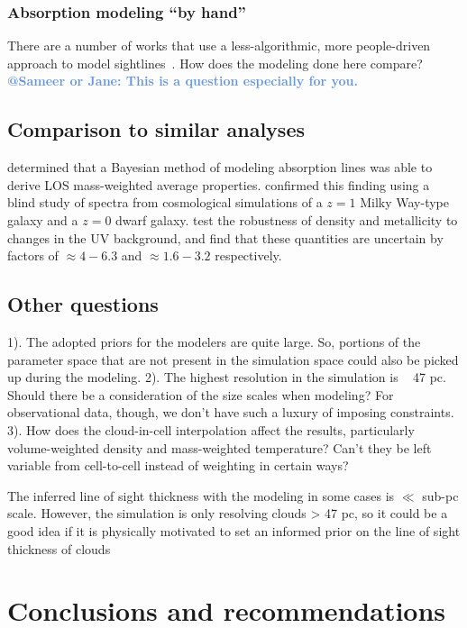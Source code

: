 \documentclass[fleqn,usenatbib]{mnras}
\makeatletter
\newcommand{\atsameer}[1]{\textcolor{CornflowerBlue}{\textbf{@Sameer or Jane: #1}}}
\makeatother
\begin{document}
\subsubsection{Absorption modeling ``by hand''}

There are a number of works that use a less-algorithmic, more people-driven approach to model sightlines~\citep[e.g.][]{Lacki2010}.
How does the modeling done here compare?
\atsameer{This is a question especially for you.}

\subsection{Comparison to similar analyses}

\cite{Liang2018} determined that a Bayesian method of modeling absorption lines was able to derive LOS mass-weighted average properties.
\cite{Marra2021} confirmed this finding using a blind study of spectra from cosmological simulations of a $z=1$ Milky Way-type galaxy and a $z=0$ dwarf galaxy.
\cite{Acharya2021} test the robustness of density and metallicity to changes in the UV background, and find that these quantities are uncertain by factors of $\approx 4-6.3$ and $\approx 1.6-3.2$ respectively.
\cite{Sameer2021} 

\subsection{Other questions}

1). The adopted priors for the modelers are quite large. So, portions of the parameter space that are not present in the simulation space could also be picked up during the modeling.
2). The highest resolution in the simulation is ~ 47 pc. Should there be a consideration of the size scales when modeling? For observational data, though, we don't have such a luxury of imposing constraints.
3). How does the cloud-in-cell interpolation affect the results, particularly volume-weighted density and mass-weighted temperature? Can't they be left variable from cell-to-cell instead of weighting in certain ways?

The inferred line of sight thickness with the modeling in some cases is $\ll$ sub-pc scale.
However, the simulation is only resolving clouds > 47 pc, so it could be a good idea if it is physically motivated to set an informed prior on the line of sight thickness of clouds

\section{Conclusions and recommendations}
\label{s: conclusions}
\end{document}
